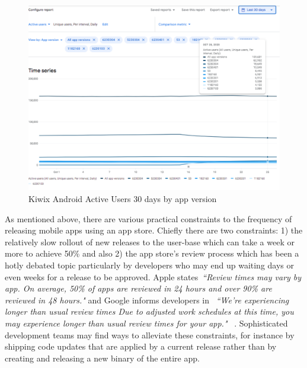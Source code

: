 \begin{figure}
    \includegraphics[width=\linewidth]{images/android-vitals-screenshots/kiwix/kiwix-ActiveUsers-30-days-2020-10-29.pdf}
    \caption{Kiwix Android Active Users 30 days by app version}
    \label{fig:kiwix-30d-active-users}
\end{figure}

As mentioned above, there are various practical constraints to the frequency of releasing mobile apps using an app store. Chiefly there are two constraints: 1) the relatively slow rollout of new releases to the user-base which can take a week or more to achieve 50\% and also 2) the app store's review process which has been a hotly debated topic particularly by developers who may end up waiting days or even weeks for a release to be approved. Apple states~\emph{``Review times may vary by app. On average, 50\% of apps are reviewed in 24 hours and over 90\% are reviewed in 48 hours."} and Google informs developers in ~\emph{``We're experiencing longer than usual review times
Due to adjusted work schedules at this time, you may experience longer than usual review times for your app."} ~. Sophisticated development teams may find ways to alleviate these constraints, for instance by shipping code updates that are applied by a current release rather than by creating and releasing a new binary of the entire app.



